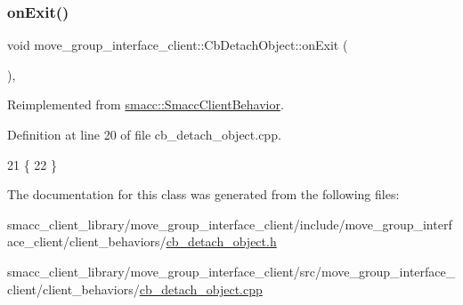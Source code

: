 \subsubsection{\texorpdfstring{on\+Exit()}{onExit()}}
{\footnotesize\ttfamily void move\+\_\+group\+\_\+interface\+\_\+client\+::\+Cb\+Detach\+Object\+::on\+Exit (\begin{DoxyParamCaption}{ }\end{DoxyParamCaption})\hspace{0.3cm}{\ttfamily [override]}, {\ttfamily [virtual]}}



Reimplemented from \hyperlink{classsmacc_1_1SmaccClientBehavior_a7e4fb6ce81ff96dc172425852d69c0c5}{smacc\+::\+Smacc\+Client\+Behavior}.



Definition at line 20 of file cb\+\_\+detach\+\_\+object.\+cpp.


\begin{DoxyCode}
21     \{
22     \}
\end{DoxyCode}


The documentation for this class was generated from the following files\+:\begin{DoxyCompactItemize}
\item 
smacc\+\_\+client\+\_\+library/move\+\_\+group\+\_\+interface\+\_\+client/include/move\+\_\+group\+\_\+interface\+\_\+client/client\+\_\+behaviors/\hyperlink{cb__detach__object_8h}{cb\+\_\+detach\+\_\+object.\+h}\item 
smacc\+\_\+client\+\_\+library/move\+\_\+group\+\_\+interface\+\_\+client/src/move\+\_\+group\+\_\+interface\+\_\+client/client\+\_\+behaviors/\hyperlink{cb__detach__object_8cpp}{cb\+\_\+detach\+\_\+object.\+cpp}\end{DoxyCompactItemize}
